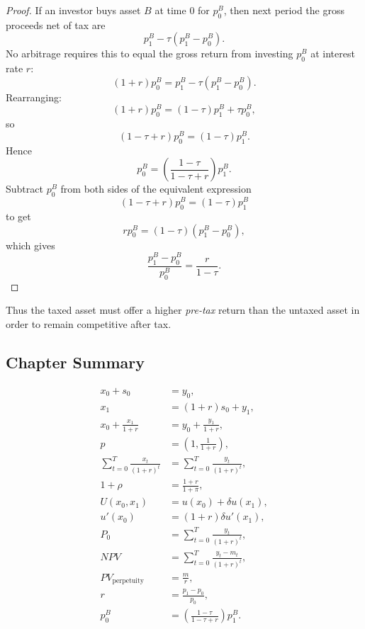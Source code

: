 \begin{proof}
If an investor buys asset $B$ at time 0 for $p_0^B$, then next period the gross proceeds net of tax are
\[
p_1^B - \tau(p_1^B-p_0^B).
\]
No arbitrage requires this to equal the gross return from investing $p_0^B$ at interest rate $r$:
\[
(1+r)p_0^B = p_1^B - \tau(p_1^B-p_0^B).
\]
Rearranging:
\[
(1+r)p_0^B = (1-\tau)p_1^B + \tau p_0^B,
\]
so
\[
(1-\tau+r)p_0^B = (1-\tau)p_1^B.
\]
Hence
\[
p_0^B = \left(\frac{1-\tau}{1-\tau+r}\right)p_1^B.
\]
Subtract $p_0^B$ from both sides of the equivalent expression
\[
(1-\tau+r)p_0^B=(1-\tau)p_1^B
\]
to get
\[
rp_0^B = (1-\tau)(p_1^B-p_0^B),
\]
which gives
\[
\frac{p_1^B-p_0^B}{p_0^B}=\frac{r}{1-\tau}.
\]
\end{proof}

Thus the taxed asset must offer a higher \emph{pre-tax} return than the untaxed asset in order to remain competitive after tax.

\subsection{Chapter Summary}

\begin{keyformula}[title={Key Formula: Lecture 4 Summary}]
\begin{align*}
x_0+s_0 &= y_0, \\
x_1 &= (1+r)s_0+y_1, \\
x_0+\frac{x_1}{1+r} &= y_0+\frac{y_1}{1+r}, \\
p &= \left(1,\frac{1}{1+r}\right), \\
\sum_{t=0}^{T}\frac{x_t}{(1+r)^t} &= \sum_{t=0}^{T}\frac{y_t}{(1+r)^t}, \\
1+\rho &= \frac{1+r}{1+\pi}, \\
U(x_0,x_1) &= u(x_0)+\delta u(x_1), \\
u'(x_0) &= (1+r)\delta u'(x_1), \\
P_0 &= \sum_{t=0}^{T}\frac{y_t}{(1+r)^t}, \\
NPV &= \sum_{t=0}^{T}\frac{y_t-m_t}{(1+r)^t}, \\
PV_{\text{perpetuity}} &= \frac{m}{r}, \\
r &= \frac{p_1-p_0}{p_0}, \\
p_0^B &= \left(\frac{1-\tau}{1-\tau+r}\right)p_1^B.
\end{align*}
\end{keyformula}


